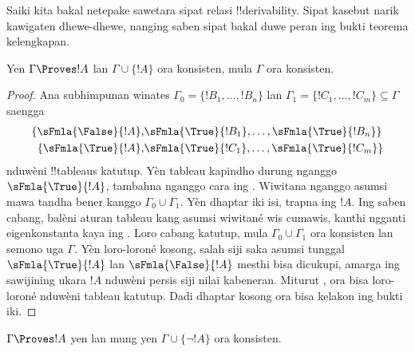 \documentclass[../../../include/open-logic-section]{subfiles}
\begin{document}
      {}
      {}


Saiki kita bakal netepake sawetara sipat relasi !!{derivability}.
Sipat kasebut narik kawigaten dhewe-dhewe, nanging saben sipat bakal
duwe peran ing bukti teorema kelengkapan.

\begin{prop}
  Yen $\Gamma \Proves !A$ lan $\Gamma \cup \{!A\}$ ora konsisten,
  mula $\Gamma$ ora konsisten.
\end{prop}

\begin{proof}
Ana subhimpunan winates $\Gamma_0 = \{!B_1, \dots, !B_n\}$ lan $\Gamma_1
  =\{!C_1, \dots, !C_m\} \subseteq \Gamma$ saengga
  \begin{align*}
    \{\sFmla{\False}{!A}, &
    \sFmla{\True}{!B_1}, \dots, \sFmla{\True}{!B_n}\} \\
    \{\sFmla{\True}{!A}, &
    \sFmla{\True}{!C_1}, \dots, \sFmla{\True}{!C_m}\}
  \end{align*}
  nduwèni !!{tableau}s katutup. Yèn tableau kapindho durung nganggo
  $\sFmla{\True}{!A}$, tambahna nganggo cara ing .
  Wiwitana nganggo asumsi mawa tandha bener kanggo $\Gamma_0\cup\Gamma_1$.
  Yèn dhaptar iki isi, trapna \Cut{} ing $!A$. Ing saben cabang, balèni
  aturan tableau kang asumsi wiwitané wis cumawis, kanthi ngganti
  eigenkonstanta kaya ing . Loro cabang katutup,
  mula $\Gamma_0\cup\Gamma_1$ ora konsisten lan semono uga $\Gamma$.
  Yèn loro-loroné kosong, salah siji saka asumsi tunggal $\sFmla{\True}{!A}$
  lan $\sFmla{\False}{!A}$ mesthi bisa dicukupi, amarga ing sawijining
   ukara $!A$ nduwèni persis siji nilai
  kabeneran. Miturut , ora bisa loro-loroné nduwèni
  tableau katutup. Dadi dhaptar kosong ora bisa kelakon ing bukti iki.
\end{proof}

\begin{prop}
$\Gamma \Proves !A$ yen lan mung yen $\Gamma \cup \{\lnot !A\}$ ora
konsisten.
\end{prop}
\end{document}
